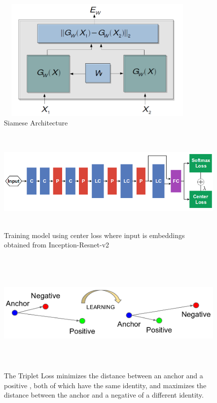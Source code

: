 \documentclass[a4paper,12pt, twoside]{NITKReport}
\begin{document}
\begin{figure} [h]
\centering
    \includegraphics[height=6cm,width=10cm]{siamese.png}
    \caption{Siamese Architecture}
    \label{siamese}
\end{figure}
\begin{figure} [h]
\centering
    \includegraphics[height=5cm,width=15cm]{center.png}
    \caption{Training model using center loss where input is embeddings obtained from Inception-Resnet-v2}
    \label{center}
\end{figure}
\begin{figure}[h]
\centering
    \includegraphics[height=6cm,width=13cm]{Selection_034.png}
    \caption{The Triplet Loss minimizes the distance between an anchor and a positive , both of which have the same identity, and maximizes the distance between the anchor and a negative of a different identity.}
    \label{triplet}
 
\end{figure}
\end{document}
